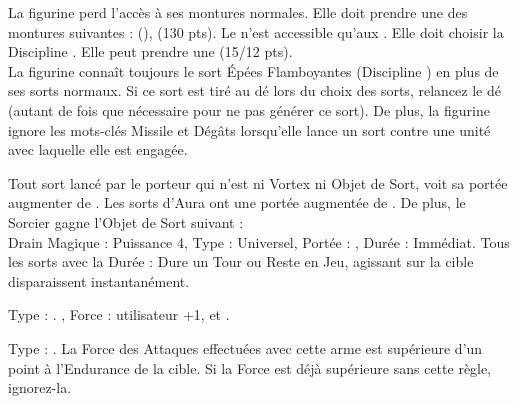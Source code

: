 \begin{multicols}{2}

La figurine perd l'accès à ses montures normales. Elle doit prendre une des montures suivantes : \youngdragon (\free), \dragon (130 pts). Le \dragon n'est accessible qu'aux \archmages. Elle doit choisir la Discipline \fire. Elle peut prendre une \dragonforgedarmour (15/12 pts).\\
La figurine connaît toujours le sort Épées Flamboyantes (Discipline \fire) en plus de ses sorts normaux. Si ce sort est tiré au dé lors du choix des sorts, relancez le dé (autant de fois que nécessaire pour ne pas générer ce sort). De plus, la figurine ignore les mots-clés Missile et Dégâts lorsqu'elle lance un sort contre une unité avec laquelle elle est engagée.

Tout sort lancé par le porteur qui n'est ni Vortex ni Objet de Sort, voit sa portée augmenter de . Les sorts d'Aura ont une portée augmentée de . De plus, le Sorcier gagne l'Objet de Sort suivant :\\
		Drain Magique : Puissance 4, Type : Universel, Portée : , Durée : Immédiat. Tous les sorts avec la Durée : Dure un Tour ou Reste en Jeu, agissant sur la cible disparaissent instantanément.

\endpricelistNSP
\end{multicols}

\closearmynewsection

\startarmymagicalitems

\armymagicalweapons

\startpricelist

Type : \longbow. , Force : utilisateur +1,  et .

Type : \spear. La Force des Attaques effectuées avec cette arme est supérieure d'un point à l'Endurance de la cible. Si la Force est déjà supérieure sans cette règle, ignorez-la.

\endpricelist

\armymagicalarmour

\startpricelist


